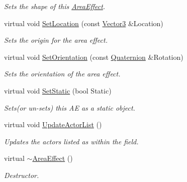 \begin{DoxyCompactItemize}
\begin{DoxyCompactList}\small\item\em Sets the shape of this \hyperlink{classphys_1_1AreaEffect}{AreaEffect}. \item\end{DoxyCompactList}\item 
virtual void \hyperlink{classphys_1_1AreaEffect_a6d1499c36db3bbb5341ee3aa2e90b52f}{SetLocation} (const \hyperlink{classphys_1_1Vector3}{Vector3} \&Location)
\begin{DoxyCompactList}\small\item\em Sets the origin for the area effect. \item\end{DoxyCompactList}\item 
virtual void \hyperlink{classphys_1_1AreaEffect_a426c3cb70e8de1fc90d4acdf2e425cd6}{SetOrientation} (const \hyperlink{classphys_1_1Quaternion}{Quaternion} \&Rotation)
\begin{DoxyCompactList}\small\item\em Sets the orientation of the area effect. \item\end{DoxyCompactList}\item 
virtual void \hyperlink{classphys_1_1AreaEffect_acc55b82b29952902c3e9a3810decf3d9}{SetStatic} (bool Static)
\begin{DoxyCompactList}\small\item\em Sets(or un-\/sets) this AE as a static object. \item\end{DoxyCompactList}\item 
virtual void \hyperlink{classphys_1_1AreaEffect_a0a0e6dfc6353d19b19e7bea037172072}{UpdateActorList} ()
\begin{DoxyCompactList}\small\item\em Updates the actors listed as within the field. \item\end{DoxyCompactList}\item 
virtual \hyperlink{classphys_1_1AreaEffect_aa9e6d721d337c32aa47357060d319924}{$\sim$AreaEffect} ()
\begin{DoxyCompactList}\small\item\em Destructor. \item\end{DoxyCompactList}\end{DoxyCompactItemize}
